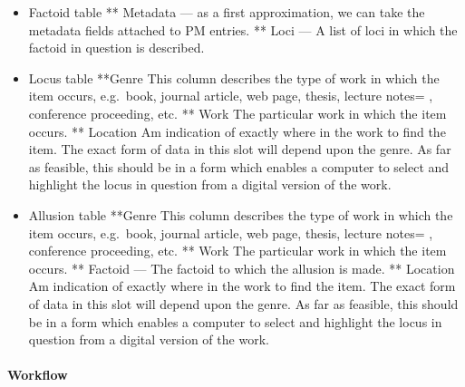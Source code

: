 \begin{itemize}
\item
  Factoid table ** Metadata --- as a first approximation, we can take
  the metadata fields attached to PM entries. ** Loci --- A list of loci
  in which the factoid in question is described.
\item
  Locus table **Genre  This column describes the type of work in
  which the item occurs, e.g.~book, journal article, web page, thesis,
  lecture notes= , conference proceeding, etc. ** Work  The
  particular work in which the item occurs. ** Location  Am
  indication of exactly where in the work to find the item. The exact
  form of data in this slot will depend upon the genre. As far as
  feasible, this should be in a form which enables a computer to select
  and highlight the locus in question from a digital version of the
  work.
\item
  Allusion table **Genre  This column describes the type of work in
  which the item occurs, e.g.~book, journal article, web page, thesis,
  lecture notes= , conference proceeding, etc. ** Work  The
  particular work in which the item occurs. ** Factoid --- The factoid
  to which the allusion is made. ** Location Am indication of
  exactly where in the work to find the item. The exact form of data in
  this slot will depend upon the genre. As far as feasible, this should
  be in a form which enables a computer to select and highlight the
  locus in question from a digital version of the work.
\end{itemize}

\paragraph{Workflow}

